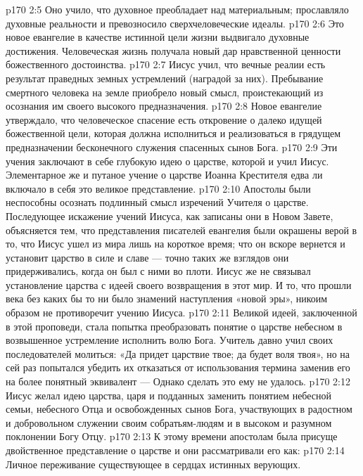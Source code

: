 \vs p170 2:5 \bibnobreakspace Оно учило, что духовное преобладает над материальным; прославляло духовные реальности и превозносило сверхчеловеческие идеалы.
\vs p170 2:6 \bibnobreakspace Это новое евангелие в качестве истинной цели жизни выдвигало духовные достижения. Человеческая жизнь получала новый дар нравственной ценности божественного достоинства.
\vs p170 2:7 \bibnobreakspace Иисус учил, что вечные реалии есть результат праведных земных устремлений (наградой за них). Пребывание смертного человека на земле приобрело новый смысл, проистекающий из осознания им своего высокого предназначения.
\vs p170 2:8 \bibnobreakspace Новое евангелие утверждало, что человеческое спасение есть откровение о далеко идущей божественной цели, которая должна исполниться и реализоваться в грядущем предназначении бесконечного служения спасенных сынов Бога.
\vs p170 2:9 \pc Эти учения заключают в себе глубокую идею о царстве, которой и учил Иисус. Элементарное же и путаное учение о царстве Иоанна Крестителя едва ли включало в себя это великое представление.
\vs p170 2:10 Апостолы были неспособны осознать подлинный смысл изречений Учителя о царстве. Последующее искажение учений Иисуса, как записаны они в Новом Завете, объясняется тем, что представления писателей евангелия были окрашены верой в то, что Иисус ушел из мира лишь на короткое время; что он вскоре вернется и установит царство в силе и славе --- точно таких же взглядов они придерживались, когда он был с ними во плоти. Иисус же не связывал установление царства с идеей своего возвращения в этот мир. И то, что прошли века без каких бы то ни было знамений наступления «новой эры», никоим образом не противоречит учению Иисуса.
\vs p170 2:11 Великой идеей, заключенной в этой проповеди, стала попытка преобразовать понятие о царстве небесном в возвышенное устремление исполнить волю Бога. Учитель давно учил своих последователей молиться: «Да придет царствие твое; да будет воля твоя», но на сей раз попытался убедить их отказаться от использования термина  заменив его на более понятный эквивалент ---  Однако сделать это ему не удалось.
\vs p170 2:12 Иисус желал идею царства, царя и подданных заменить понятием небесной семьи, небесного Отца и освобожденных сынов Бога, участвующих в радостном и добровольном служении своим собратьям\hyp{}людям и в высоком и разумном поклонении Богу Отцу.
\vs p170 2:13 К этому времени апостолам была присуще двойственное представление о царстве и они рассматривали его как:
\vs p170 2:14 \bibnobreakspace Личное переживание существующее в сердцах истинных верующих.
